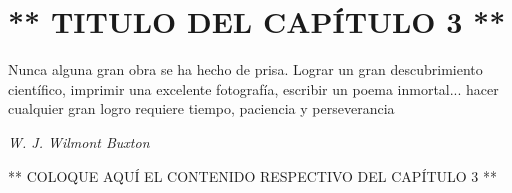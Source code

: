 \chapter{** TITULO DEL CAPÍTULO 3 **}
\thispagestyle{empty}

\epigraph{\flushright Nunca alguna gran obra se ha hecho de prisa. Lograr un gran descubrimiento científico, imprimir una excelente fotografía, escribir un poema inmortal... hacer cualquier gran logro requiere tiempo, paciencia y perseverancia}{\textit{W. J. Wilmont Buxton}}

** COLOQUE AQUÍ EL CONTENIDO RESPECTIVO DEL CAPÍTULO 3 **
